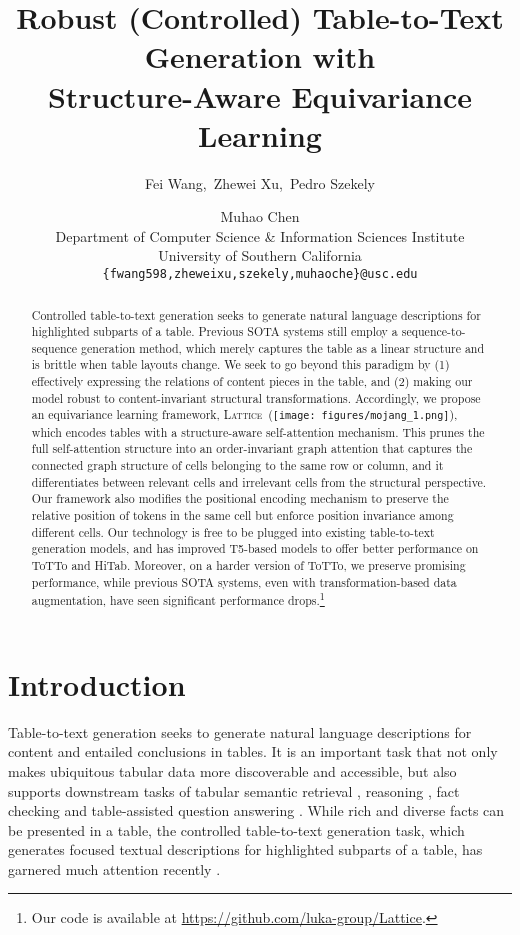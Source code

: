 \documentclass[11pt]{article}
\title{Robust (Controlled) Table-to-Text Generation with\\ Structure-Aware Equivariance Learning
}
\author{Fei Wang,\;~Zhewei Xu,\;~Pedro Szekely \and Muhao Chen \\
  Department of Computer Science \& Information Sciences Institute\\
  University of Southern California \\
  \texttt{\{fwang598,zheweixu,szekely,muhaoche\}@usc.edu} 
  }
\newcommand{\model}{\mbox{\textsc{Lattice}}\xspace}
\newcommand{\mojang}{\texttt{[image: figures/mojang\_1.png]}}
\begin{document}
\maketitle

\begin{abstract}

Controlled table-to-text generation seeks to generate natural language descriptions for highlighted subparts of a table. Previous SOTA systems still employ a sequence-to-sequence generation method, which merely captures the table as a linear structure and is brittle when table layouts change. 
We seek to go beyond this paradigm by (1) effectively expressing the relations of content pieces in the table, and (2) making our model robust to content-invariant structural transformations. 
Accordingly, we propose an equivariance learning framework, \model~(\mojang), which encodes tables with a structure-aware self-attention mechanism. 
This prunes the full self-attention structure into an order-invariant graph attention that captures the connected graph structure of cells belonging to the same row or column, and it differentiates between relevant cells and irrelevant cells from the structural perspective. 
Our framework also modifies the positional encoding mechanism to preserve the relative position of tokens in the same cell but enforce position invariance among different cells. 
Our technology is free to be plugged into existing table-to-text generation models, and has improved T5-based models to offer better performance on ToTTo and HiTab. 
Moreover, on a harder version of ToTTo, we preserve promising performance, while previous SOTA systems, even with transformation-based data augmentation, have seen significant performance drops.\footnote{Our code is available at \url{https://github.com/luka-group/Lattice}.}
\end{abstract} \section{Introduction}







Table-to-text generation seeks to generate natural language descriptions for content and entailed conclusions in tables.
It is an important task that not only makes ubiquitous tabular data more discoverable and accessible,
but also supports downstream tasks of tabular semantic retrieval \cite{wang2021retrieving},
reasoning \cite{gupta2020infotabs}, fact checking \cite{chen2019tabfact,wang2021table} and table-assisted question answering \cite{chen2020hybridqa}.
While rich and diverse facts can be presented in a table,
the controlled table-to-text generation task, which generates focused textual descriptions for highlighted subparts of a table, has garnered much attention recently \citep{parikh2020totto, kale2020text, cheng2021hitab}.
\end{document}
